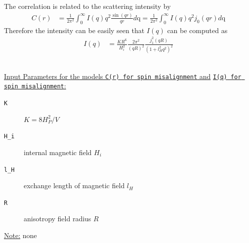 The correlation is related to the scattering intensity by
\begin{align}
C(r) &= \frac{1}{2\pi^2} \int_0^\infty I(q) q^2
\frac{\sin(qr)}{qr}d\text{q}
 = \frac{1}{2\pi^2} \int_0^\infty I(q) q^2 j_0(qr) d\text{q}
\end{align}
Therefore the intensity can be easily seen that $I(q)$ can be
computed as
\begin{align}
I(q) & = \frac{K R^6}{H_i^2}
\frac{2\pi^2}{\left(qR\right)^2}\frac{j_1^2(qR)}{\left(1+l_H^2q^2\right)^2}
\end{align}

\vspace{5mm}

\hspace{1pt}\\
\underline{Input Parameters for the models \texttt{C(r) for spin
misalignment} and} \newline \underline{\texttt{I(q) for spin misalignment}:}\\
\begin{description}
\item[\texttt{K}] $K=8H^2_P/V$
\item[\texttt{H\_i}] internal magnetic field $H_i$
\item[\texttt{l\_H}] exchange length of magnetic field $l_H$
\item[\texttt{R}] anisotropy field radius $R$
\end{description}

\noindent\underline{Note:}
none



